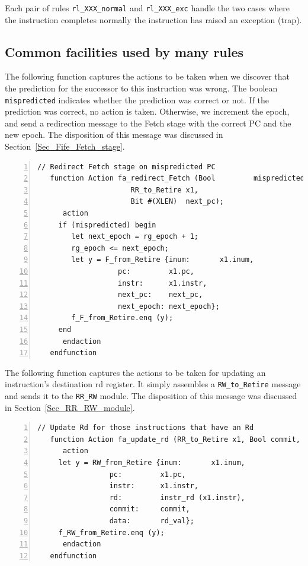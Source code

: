 Each pair of rules \verb|rl_XXX_normal| and \verb|rl_XXX_exc| handle
the two cases where the instruction completes normally {\vs} the
instruction has raised an exception (trap).


\subsection{Common facilities used by many rules}

\label{Sec_Retire_Common}

The following function captures the actions to be taken when we
discover that the prediction for the successor to this instruction was
wrong.  The boolean \verb|mispredicted| indicates whether the
prediction was correct or not.  If the prediction was correct, no
action is taken.  Otherwise, we increment the epoch, and send a
redirection message to the Fetch stage with the correct PC and the new
epoch.  The disposition of this message was discussed in
Section~\ref{Sec_Fife_Fetch_stage}.

{\small
\begin{Verbatim}[frame=single, numbers=left, label=(In file:src\_Fife/S5\_Retire.bsv)]
   // Redirect Fetch stage on mispredicted PC
   function Action fa_redirect_Fetch (Bool         mispredicted,
				      RR_to_Retire x1,
				      Bit #(XLEN)  next_pc);
      action
	 if (mispredicted) begin
	    let next_epoch = rg_epoch + 1;
	    rg_epoch <= next_epoch;
	    let y = F_from_Retire {inum:       x1.inum,
				   pc:         x1.pc,
				   instr:      x1.instr,
				   next_pc:    next_pc,
				   next_epoch: next_epoch};
	    f_F_from_Retire.enq (y);
	 end
      endaction
   endfunction
\end{Verbatim}
}

The following function captures the actions to be taken for updating
an instruction's destination rd register.  It simply assembles a
\verb|RW_to_Retire| message and sends it to the \verb|RR_RW| module.
The disposition of this message was discussed in
Section~\ref{Sec_RR_RW_module}.

{\small
\begin{Verbatim}[frame=single, numbers=left, label=(In file:src\_Fife/S5\_Retire.bsv)]
   // Update Rd for those instructions that have an Rd 
   function Action fa_update_rd (RR_to_Retire x1, Bool commit, Bit #(XLEN) rd_val);
      action
	 let y = RW_from_Retire {inum:       x1.inum,
				 pc:         x1.pc,
				 instr:      x1.instr,
				 rd:         instr_rd (x1.instr),
				 commit:     commit,
				 data:       rd_val};
	 f_RW_from_Retire.enq (y);
      endaction
   endfunction
\end{Verbatim}
}

